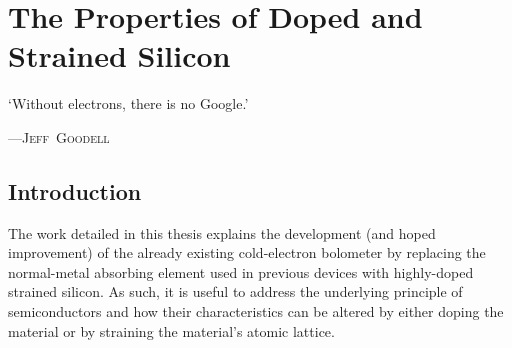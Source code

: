 \chapter{The Properties of Doped and Strained Silicon} 
\label{cha:material}
\epigraph{`Without electrons, there is no Google.'}{\mbox{\textup{---\textsc{Jeff Goodell}}}}
%
\section{Introduction}\label{sec:material-introduction}
The work detailed in this thesis explains the development (and hoped improvement) of the already existing cold-electron bolometer by replacing the normal-metal absorbing element used in previous devices \parencite{Kuzmin2004,Otto2013} with highly-doped strained silicon. As such, it is useful to address the underlying principle of semiconductors and how their characteristics can be altered by either doping the material or by straining the material's atomic lattice.%

